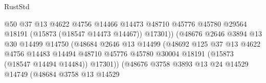 \begin{lexlean}{RustStd}
\begin{coremodule}
                                            @50
                                            @37
                                            @13
                                            @4622
                                            @4756
                                            @14466
                                            @14473
                                            @48710
                                            @45776
                                            @45780
                                            @29564
                                            @18191
                                            (@15873 (@18547 @14473 @14467))
                                            @17301))
                                        (@48676
                                          @2646
                                          @3894
                                          @13
                                          @30
                                          @14499
                                          @14750
                                          (@48684
                                            @2646
                                            @13
                                            @14499
                                            (@48692
                                              @125
                                              @37
                                              @13
                                              @4622
                                              @4756
                                              @14483
                                              @14494
                                              @48710
                                              @45776
                                              @45780
                                              @30004
                                              @18191
                                              (@15873 (@18547 @14494 @14484))
                                              @17301))
                                          (@48676
                                            @3758
                                            @3893
                                            @13
                                            @24
                                            @14529
                                            @14749
                                            (@48684
                                              @3758
                                              @13
                                              @14529

\end{coremodule}
\end{lexlean}
